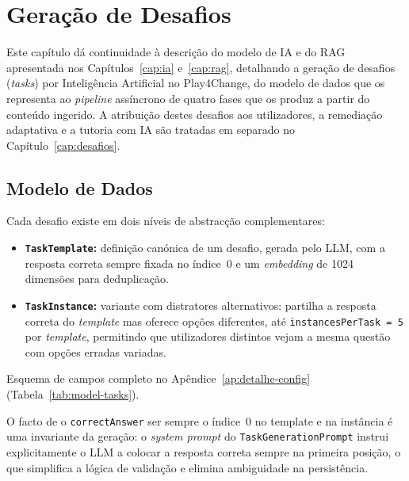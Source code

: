 %
%
\chapter{Geração de Desafios} \label{cap:geracao-desafios}

Este capítulo dá continuidade à descrição do modelo de IA e do RAG apresentada nos Capítulos~\ref{cap:ia} e~\ref{cap:rag}, detalhando a geração de desafios (\textit{tasks}) por Inteligência Artificial no Play4Change, do modelo de dados que os representa ao \textit{pipeline} assíncrono de quatro fases que os produz a partir do conteúdo ingerido. A atribuição destes desafios aos utilizadores, a remediação adaptativa e a tutoria com IA são tratadas em separado no Capítulo~\ref{cap:desafios}.

\section{Modelo de Dados} \label{sec:modelo-dados-desafios}

Cada desafio existe em dois níveis de abstracção complementares:

\begin{itemize}
    \item \textbf{\texttt{TaskTemplate}:} definição canónica de um desafio, gerada pelo LLM, com a resposta correta sempre fixada no índice~0 e um \textit{embedding} de 1024 dimensões para deduplicação.
    \item \textbf{\texttt{TaskInstance}:} variante com distratores alternativos: partilha a resposta correta do \textit{template} mas oferece opções diferentes, até \texttt{instancesPerTask~=~5} por \textit{template}, permitindo que utilizadores distintos vejam a mesma questão com opções erradas variadas.
\end{itemize}
Esquema de campos completo no Apêndice~\ref{ap:detalhe-config} (Tabela~\ref{tab:model-tasks}).

O facto de o \texttt{correctAnswer} ser sempre o índice~0 no template e na instância é uma invariante da geração: o \textit{system prompt} do \texttt{TaskGenerationPrompt} instrui explicitamente o LLM a colocar a resposta correta sempre na primeira posição, o que simplifica a lógica de validação e elimina ambiguidade na persistência.

